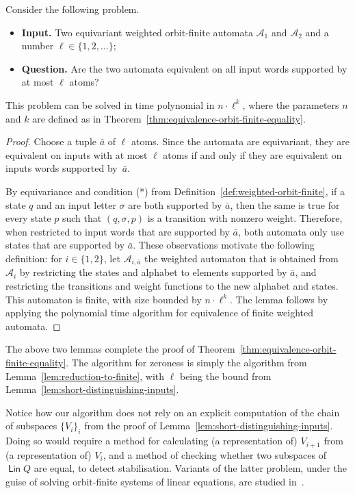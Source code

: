 \documentclass[10pt,a4paper]{amsart}
\numberwithin{equation}{section}
\newcommand{\set}[1]{\{#1\}}
\newcommand{\Aa}{{\mathcal A}}
\DeclareMathOperator{\lin}{\mathsf{Lin}}
\begin{document}
\begin{lemma}\label{lem:reduction-to-finite}
    Consider the following problem. 
\begin{itemize}
\item {\bf Input.} Two equivariant weighted orbit-finite automata $\Aa_1$ and $\Aa_2$ and a number $\ell \in \set{1,2,\ldots}$;
\item {\bf Question.} Are the two  automata equivalent on all input words supported by at most $\ell$ atoms?
\end{itemize}
This problem can be solved  in time polynomial in $n  \cdot \ell^k$, where the parameters $n$ and $k$ are defined as in Theorem~\ref{thm:equivalence-orbit-finite-equality}.
    \end{lemma}
\begin{proof}
    Choose a tuple $\bar a$ of $\ell$ atoms. Since the automata are equivariant, they are equivalent on inputs with at most $\ell$ atoms if and only if they are equivalent on inputs words supported by~$\bar a$. 

    By equivariance and condition (*) from Definition~\ref{def:weighted-orbit-finite}, if a state $q$  and an input letter $\sigma$ are both supported by $\bar a$, then the same is true for every state $p$ such that $(q,\sigma,p)$ is a transition with nonzero weight.  Therefore, when restricted to input words that are supported by $\bar a$, both automata only use states that are supported by $\bar a$.  These observations motivate the  following definition: for $i \in \set{1,2}$,   let  $\Aa_{i, \bar a}$ the  weighted automaton that is obtained from $\Aa_i$ by restricting  the states and alphabet to elements supported by $\bar a$, and restricting the transitions and weight functions to the new alphabet and states. 
    This automaton is finite, 
with size  bounded by $n \cdot \ell^k$. The lemma follows by applying the polynomial time algorithm for equivalence of finite weighted automata. 
\end{proof}

The above two lemmas complete the proof of Theorem~\ref{thm:equivalence-orbit-finite-equality}. The algorithm for zeroness is simply the algorithm from Lemma~\ref{lem:reduction-to-finite}, with $\ell$ being the bound  from Lemma~\ref{lem:short-distinguishing-inputs}.

Notice how our algorithm does not rely on an explicit computation of the chain of subspaces $\{V_i\}_i$ from the proof of Lemma~\ref{lem:short-distinguishing-inputs}. Doing so would require a method for calculating (a representation of) $V_{i+1}$ from (a representation of) $V_i$, and a method of checking whether two subspaces of $\lin Q$ are equal, to detect stabilisation. Variants of the latter problem, under the guise of solving orbit-finite systems of linear equations, are studied in~\cite{GHL22}.
\end{document}
